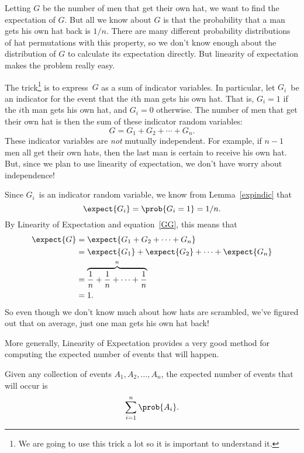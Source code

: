Letting $G$ be the number of men that get their own hat, we want to find
the expectation of $G$.  But all we know about $G$ is that the probability
that a man gets his own hat back is $1/n$.  There are many different
probability distributions of hat permutations with this property, so we
don't know enough about the distribution of $G$ to calculate its
expectation directly.  But linearity of expectation makes the problem
really easy.

The trick\footnote{We are going to use this trick a lot so it is
  important to understand it.} is to express~$G$ as a sum of indicator
variables.  In particular, let $G_i$~be an indicator for the event
that the $i$th man gets his own hat.  That is, $G_i = 1$ if the $i$th
man gets his own hat, and $G_i = 0$ otherwise.  The number of men that
get their own hat is then the sum of these indicator random variables:
\begin{equation}\label{GG}
    G = G_1 + G_2 + \cdots + G_n.
\end{equation}
These indicator variables are \emph{not} mutually independent.  For
example, if $n-1$ men all get their own hats, then the last man is
certain to receive his own hat.  But, since we plan to use linearity
of expectation, we don't have worry about independence!

Since $G_i$~is an indicator random variable, we know from
Lemma~\ref{expindic} that
\begin{equation}
    \expect{G_i}= \prob{G_i=1} = 1/n.
\end{equation} 
By Linearity of Expectation and equation~\eqref{GG}, this means that
\begin{align*}
\expect{G} & = \expect{G_1 + G_2 + \cdots + G_n} \\
       & = \expect{G_1} + \expect{G_2} + \cdots + \expect{G_n}\\
       & = \overbrace{\frac{1}{n} + \frac{1}{n} + \cdots + \frac{1}{n}}^n \\
       &= 1.
\end{align*}
So even though we don't know much about how hats are scrambled, we've
figured out that on average, just one man gets his own hat back!

More generally, Linearity of Expectation provides a very good method
for computing the expected number of events that will happen.

\begin{theorem}\label{thm:17T3}
Given any collection of events $A_1, A_2, \dots, A_n$, the expected
number of events that will occur is
\begin{equation*}
    \sum_{i = 1}^n \prob{A_i}.
\end{equation*}
\end{theorem}

